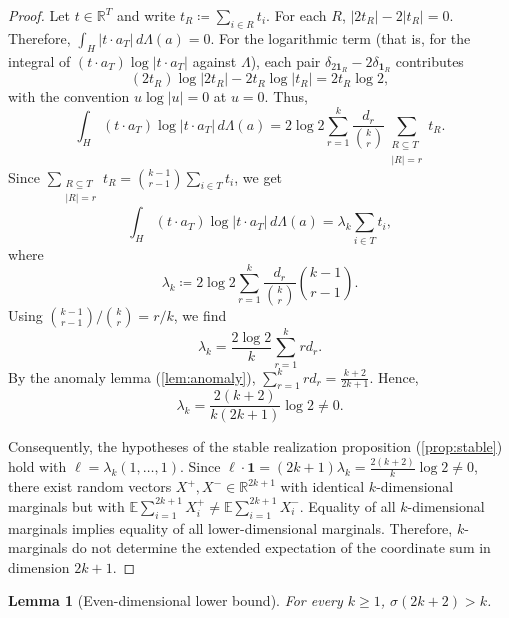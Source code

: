 \documentclass[11pt]{amsart}
\theoremstyle{plain}
\newtheorem{lemma}{Lemma}
\theoremstyle{definition}
\theoremstyle{remark}
\numberwithin{equation}{section}
\newcommand{\R}{\mathbb R}
\newcommand{\E}{\mathbb E}
\newcommand{\1}{\mathbf 1}
\begin{document}
\begin{proof}
Let \(t\in\R^T\) and write \(t_R\coloneqq\sum_{i\in R}t_i\). For each \(R\), \(\lvert2t_R\rvert-2\lvert t_R\rvert=0\). Therefore, \(\int_H\lvert t\cdot a_T\rvert\,d\Lambda\left(a\right)=0\). For the logarithmic term (that is, for the integral of \(\left(t\cdot a_T\right)\log\lvert t\cdot a_T\rvert\) against \(\Lambda\)), each pair \(\delta_{2\1_R}-2\delta_{\1_R}\) contributes
\[
\left(2t_R\right)\log\left\lvert2t_R\right\rvert-2t_R\log\left\lvert t_R\right\rvert=2t_R\log2,
\]
with the convention \(u\log\lvert u\rvert=0\) at \(u=0\). Thus,
\[\int_H\left(t\cdot a_T\right)\log\left\lvert t\cdot a_T\right\rvert\,d\Lambda\left(a\right) =2\log2\sum_{r=1}^k\frac{d_r}{\binom{k}{r}}\sum_{\substack{R\subseteq T\\\lvert R\rvert=r}}t_R.\]
Since \(\sum_{\substack{R\subseteq T\\\lvert R\rvert=r}}t_R=\binom{k-1}{r-1}\sum_{i\in T}t_i\), we get
\[
\int_H\left(t\cdot a_T\right)\log\left\lvert t\cdot a_T\right\rvert\,d\Lambda\left(a\right)=\lambda_k\sum_{i\in T}t_i,
\]
where
\[
\lambda_k\coloneqq2\log2\sum_{r=1}^k\frac{d_r}{\binom{k}{r}}\binom{k-1}{r-1}.
\]
Using \(\binom{k-1}{r-1}/\binom{k}{r}=r/k\), we find
\[
\lambda_k=\frac{2\log2}{k}\sum_{r=1}^krd_r.
\]
By the anomaly lemma (\ref{lem:anomaly}), \(\sum_{r=1}^krd_r=\frac{k+2}{2k+1}\). Hence,
\[
\lambda_k=\frac{2\left(k+2\right)}{k\left(2k+1\right)}\log2\ne0.
\]

Consequently, the hypotheses of the stable realization proposition (\ref{prop:stable}) hold with \(\ell=\lambda_k\left(1,\ldots,1\right)\). Since \(\ell\cdot\1=\left(2k+1\right)\lambda_k=\frac{2\left(k+2\right)}{k}\log2\ne0\), there exist random vectors \(X^+,X^-\in\R^{2k+1}\) with identical \(k\)-dimensional marginals but with \(\E\sum_{i=1}^{2k+1}X_i^+\ne\E\sum_{i=1}^{2k+1}X_i^-\). Equality of all \(k\)-dimensional marginals implies equality of all lower-dimensional marginals. Therefore, \(k\)-marginals do not determine the extended expectation of the coordinate sum in dimension \(2k+1\).
\end{proof}

\begin{lemma}[Even-dimensional lower bound]
For every \(k\ge1\), \(\sigma\left(2k+2\right)>k\).
\end{lemma}
\end{document}

